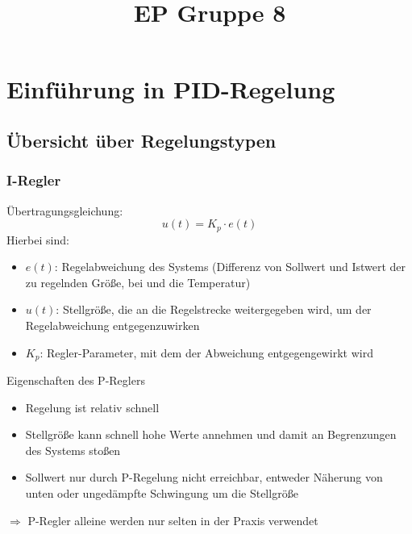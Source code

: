 \documentclass[compress,11pt]{beamer}
\title{EP Gruppe 8}
\begin{document}
\section{Einführung in PID-Regelung}
\subsection{Übersicht über Regelungstypen}
\subsubsection{I-Regler}
\begin{frame}
Übertragungsgleichung:
\begin{equation}
u(t) = K_p \cdot e(t)
\end{equation}
Hierbei sind:
\begin{itemize}
\item $e(t)$: Regelabweichung des Systems (Differenz von Sollwert und Istwert der zu regelnden Größe, bei und die Temperatur)
\item $u(t)$: Stellgröße, die an die Regelstrecke weitergegeben wird, um der Regelabweichung entgegenzuwirken
\item $K_p$: Regler-Parameter, mit dem der Abweichung entgegengewirkt wird
\end{itemize}
\end{frame}
\begin{frame}
\begin{block}{Eigenschaften des P-Reglers}
\begin{itemize}
\item Regelung ist relativ schnell
\item Stellgröße kann schnell hohe Werte annehmen und damit an Begrenzungen des Systems stoßen
\item Sollwert nur durch P-Regelung nicht erreichbar, entweder Näherung von unten oder ungedämpfte Schwingung um die Stellgröße
\end{itemize}
\end{block}

$\Rightarrow$ P-Regler alleine werden nur selten in der Praxis verwendet

\end{frame}
\end{document}
